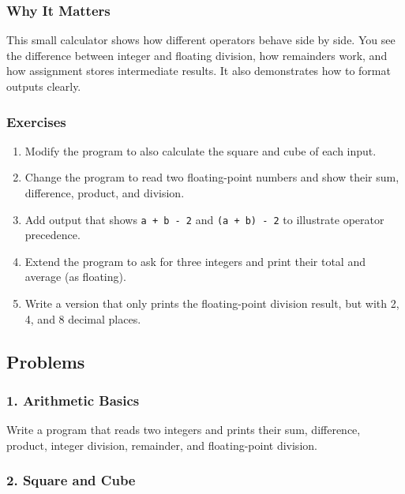 \documentclass[
  letterpaper,
  DIV=11,
  numbers=noendperiod]{scrreprt}
\providecommand{\tightlist}{%
  \setlength{\itemsep}{0pt}\setlength{\parskip}{0pt}}
\begin{document}
\subsubsection{Why It Matters}\label{why-it-matters-13}

This small calculator shows how different operators behave side by side.
You see the difference between integer and floating division, how
remainders work, and how assignment stores intermediate results. It also
demonstrates how to format outputs clearly.

\subsubsection{Exercises}\label{exercises-14}

\begin{enumerate}
\def\labelenumi{\arabic{enumi}.}
\tightlist
\item
  Modify the program to also calculate the square and cube of each
  input.
\item
  Change the program to read two floating-point numbers and show their
  sum, difference, product, and division.
\item
  Add output that shows \texttt{a\ +\ b\ -\ 2} and
  \texttt{(a\ +\ b)\ -\ 2} to illustrate operator precedence.
\item
  Extend the program to ask for three integers and print their total and
  average (as floating).
\item
  Write a version that only prints the floating-point division result,
  but with 2, 4, and 8 decimal places.
\end{enumerate}

\subsection{Problems}\label{problems-1}

\subsubsection{1. Arithmetic Basics}\label{arithmetic-basics}

Write a program that reads two integers and prints their sum,
difference, product, integer division, remainder, and floating-point
division.

\subsubsection{2. Square and Cube}\label{square-and-cube}
\end{document}
